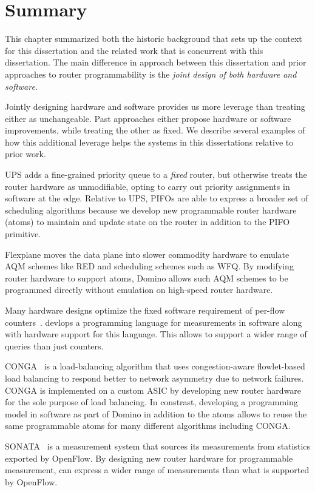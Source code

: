 \section{Summary}
This chapter summarized both the historic background that sets up the context
for this dissertation and the related work that is concurrent with this
dissertation. The main difference in approach between this dissertation and
prior approaches to router programmability is the {\em joint design of both
hardware and software}.

Jointly designing hardware and software provides us more leverage than treating
either as unchangeable. Past approaches either propose hardware or software
improvements, while treating the other as fixed. We describe several examples
of how this additional leverage helps the systems in this dissertations
relative to prior work.

 UPS adds a fine-grained priority queue to a
{\em fixed} router, but otherwise treats the router hardware as unmodifiable,
opting to carry out priority assignments in software at the edge. Relative to
UPS, PIFOs are able to express a broader set of scheduling algorithms because
we develop new programmable router hardware (atoms) to maintain and update
state on the router in addition to the PIFO primitive.

 Flexplane moves the data plane into slower commodity hardware
to emulate AQM schemes like RED and scheduling schemes such as WFQ. By
modifying router hardware to support atoms,  Domino allows such AQM schemes to
be programmed directly without emulation on high-speed router hardware.

 Many hardware designs optimize the fixed
software requirement of per-flow counters~\cite{sundar_counters, lrt}.
\TheSystem devlops a programming language for measurements in software along
with hardware support for this language. This allows \TheSystem to support a
wider range of queries than just counters.

 CONGA~\cite{conga} is a load-balancing algorithm that uses
congestion-aware flowlet-based load balancing to respond better to network
asymmetry due to network failures. CONGA is implemented on a custom ASIC by
developing new router hardware for the sole purpose of load balancing. In
constrast, developing a programming model in software as part of Domino in
addition to the atoms allows to reuse the same programmable atoms for many
different algorithms including CONGA.

 SONATA~\cite{sonata} is a measurement system that sources its
measurements from statistics exported by OpenFlow. By designing new router
hardware for programmable measurement, \TheSystem can express a wider range of
measurements than what is supported by OpenFlow.
